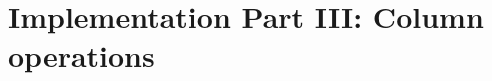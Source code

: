 \chapter{Implementation Part III: Column operations}
\label{chap:Implementation Part III: Column operations}


